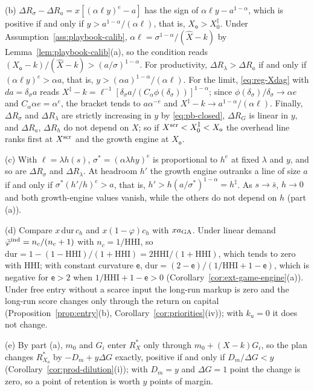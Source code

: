 (b) $\Delta R_\sigma-\Delta R_a=x[(\alpha\ell y)^{e}-a]$ has the sign of $\alpha\ell y-a^{1-\alpha}$, which is positive if and only if $y>a^{1-\alpha}/(\alpha\ell)$, that is, $X_{\mathsf o}>X^\ddagger_0$. Under Assumption~\ref{ass:playbook-calib}, $\alpha\ell=\sigma^{1-\alpha}/(\hat X-k)$ by Lemma~\ref{lem:playbook-calib}(a), so the condition reads $(X_{\mathsf o}-k)/(\hat X-k)>(a/\sigma)^{1-\alpha}$. For productivity, $\Delta R_\lambda>\Delta R_a$ if and only if $(\alpha\ell y)^{e}>\alpha a$, that is, $y>(\alpha a)^{1-\alpha}/(\alpha\ell)$. For the limit, \eqref{eq:reg-Xdag} with $da=\delta_\sigma a$ reads $X^\ddagger-k=\ell^{-1}[\delta_\sigma a/(C_\alpha\phi(\delta_\sigma))]^{1-\alpha}$; since $\phi(\delta_\sigma)/\delta_\sigma\to\alpha e$ and $C_\alpha\alpha e=\alpha^{e}$, the bracket tends to $a\alpha^{-e}$ and $X^\ddagger-k\to a^{1-\alpha}/(\alpha\ell)$. Finally, $\Delta R_\sigma$ and $\Delta R_\lambda$ are strictly increasing in $y$ by \eqref{eq:pb-closed}, $\Delta R_G$ is linear in $y$, and $\Delta R_a$, $\Delta R_h$ do not depend on $X$; so if $X^{\rm scr}<X^\ddagger_0<X_{\mathsf o}$ the overhead line ranks first at $X^{\rm scr}$ and the growth engine at $X_{\mathsf o}$.

(c) With $\ell=\lambda h(s)$, $\sigma^*=(\alpha\lambda h y)^{e}$ is proportional to $h^{e}$ at fixed $\lambda$ and $y$, and so are $\Delta R_\sigma$ and $\Delta R_\lambda$. At headroom $h'$ the growth engine outranks a line of size $a$ if and only if $\sigma^*(h'/h)^{e}>a$, that is, $h'>h(a/\sigma^*)^{1-\alpha}=h^\ddagger$. As $s\to\bar s$, $h\to0$ and both growth-engine values vanish, while the others do not depend on $h$ (part (a)).

(d) Compare $x\,\mathrm{dur}\,c_h$ and $x(1-\varphi)c_h$ with $xa_{\rm GA}$. Under linear demand $\bar\varphi^{\rm ind}=n_c/(n_c+1)$ with $n_c=1/\mathrm{HHI}$, so $\mathrm{dur}=1-(1-\mathrm{HHI})/(1+\mathrm{HHI})=2\mathrm{HHI}/(1+\mathrm{HHI})$, which tends to zero with $\mathrm{HHI}$; with constant curvature $\mathsf e$, $\mathrm{dur}=(2-\mathsf e)/(1/\mathrm{HHI}+1-\mathsf e)$, which is negative for $\mathsf e>2$ when $1/\mathrm{HHI}+1-\mathsf e>0$ (Corollary~\ref{cor:ext-game-engine}(a)). Under free entry without a scarce input the long-run markup is zero and the long-run score changes only through the return on capital (Proposition~\ref{prop:entry}(b), Corollary~\ref{cor:priorities}(iv)); with $k_u=0$ it does not change.

(e) By part (a), $m_0$ and $G_i$ enter $R^*_X$ only through $m_0+(X-k)G_i$, so the plan changes $R^*_{X_{\mathsf o}}$ by $-D_m+y\Delta G$ exactly, positive if and only if $D_m/\Delta G<y$ (Corollary~\ref{cor:prod-dilution}(i)); with $D_m=y$ and $\Delta G=1$ point the change is zero, so a point of retention is worth $y$ points of margin.

